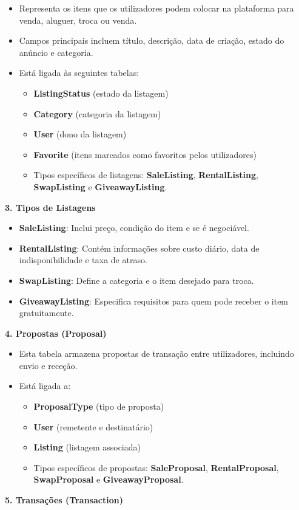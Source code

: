 \documentclass[a4paper, 12pt]{article} %
\begin{document}
\begin{itemize}
    \item Representa os itens que os utilizadores podem colocar na plataforma para venda, aluguer, troca ou venda.
    \item Campos principais incluem título, descrição, data de criação, estado do anúncio e categoria.
    \item Está ligada às seguintes tabelas:
    \begin{itemize}
        \item \textbf{ListingStatus} (estado da listagem)
        \item \textbf{Category} (categoria da listagem)
        \item \textbf{User} (dono da listagem)
        \item \textbf{Favorite} (itens marcados como favoritos pelos utilizadores)
        \item Tipos específicos de listagens: \textbf{SaleListing}, \textbf{RentalListing}, \textbf{SwapListing} e \textbf{GiveawayListing}.
    \end{itemize}
\end{itemize}
\textbf{3. Tipos de Listagens}

\begin{itemize}
    \item \textbf{SaleListing}: Inclui preço, condição do item e se é negociável.
    \item \textbf{RentalListing}: Contém informações sobre custo diário, data de indisponibilidade e taxa de atraso.
    \item \textbf{SwapListing}: Define a categoria e o item desejado para troca.
    \item \textbf{GiveawayListing}: Especifica requisitos para quem pode receber o item gratuitamente.
\end{itemize}
\textbf{4. Propostas (Proposal)}

\begin{itemize}
    \item Esta tabela armazena propostas de transação entre utilizadores, incluindo envio e receção.
    \item Está ligada a:
    \begin{itemize}
        \item \textbf{ProposalType} (tipo de proposta)
        \item \textbf{User} (remetente e destinatário)
        \item \textbf{Listing} (listagem associada)
        \item Tipos específicos de propostas: \textbf{SaleProposal}, \textbf{RentalProposal}, \textbf{SwapProposal} e \textbf{GiveawayProposal}.
    \end{itemize}
\end{itemize}
\textbf{5. Transações (Transaction)}
\end{document}
